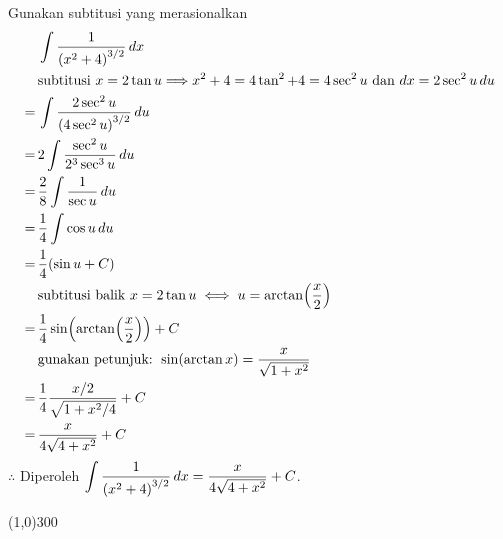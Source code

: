 \begin{enumerate}[leftmargin=*, label={\arabic*}.]
\begin{enumerate}[label={\alph*}.]
    Gunakan subtitusi yang merasionalkan
    \begin{align*}
        &\int \frac{1}{\brk*{x^{2}+4}^{3/2}}\,dx\\
        &\text{subtitusi $x=2\tan u \Longrightarrow x^2+4=4\tan^{2}+4=4\sec^{2}u$
        dan $dx=2\sec^{2}u\,du$}\\
        =\,&\int \frac{2\sec^{2}u}{\brk*{4\sec^{2}u}^{3/2}}\,du\\
        =\,&2\int\frac{\sec^{2}u}{2^{3}\sec^{3}u}\,du\\
        =\,&\frac{2}{8}\int\frac{1}{\sec u}\,du\\
        =\,&\frac{1}{4}\int\cos u\,du\\
        =\,&\frac{1}{4}\brk*{\sin u + C}\\
        &\text{subtitusi balik }x=2\tan u \iff u = \arctan\brk*{\frac{x}{2}}\\
        =\,&\frac{1}{4}\sin\brk*{\arctan\brk*{\frac{x}{2}}}+C\\
        &\text{gunakan petunjuk: }\sin(\arctan x) = \frac{x}{\sqrt{1+x^{2}}}\\
        =\,&\frac{1}{4}\frac{x/2}{\sqrt{1+x^{2}/4}}+C\\
        =\,&\frac{x}{4\sqrt{4+x^{2}}}+C
    \end{align*}
    $\therefore$ Diperoleh $\ds \int \frac{1}{\brk*{x^{2}+4}^{3/2}}\,dx 
    = \frac{x}{4\sqrt{4+x^{2}}}+C$.

    \end{enumerate}
\end{enumerate}

\begin{center}\line(1,0){300}\end{center}
